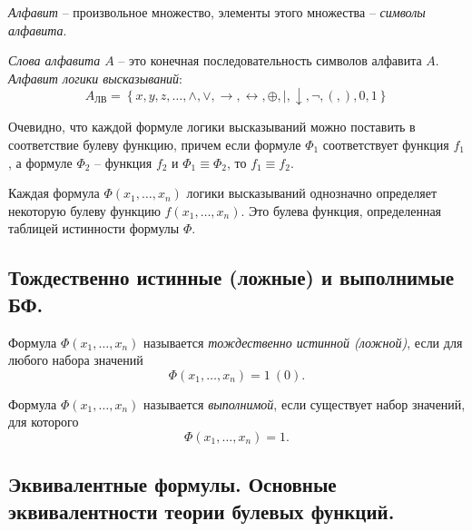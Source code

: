 \begin{remark}
    \emph{Алфавит} -- произвольное множество, элементы этого множества -- \emph{символы алфавита}.

    \emph{Слова алфавита $A$} -- это конечная последовательность символов алфавита $A$. \emph{Алфавит логики высказываний}:
    \[
        A_{\text{ЛВ}} = \left\{x,y,z,\ldots,\land,\lor,\rightarrow,\leftrightarrow,\oplus,\vert,\downarrow,\lnot,(,),0,1\right\}
    \]
\end{remark}

\begin{remark}
    Очевидно, что каждой формуле логики высказываний можно поставить в соответствие булеву функцию, причем если формуле $\Phi_1$ соответствует функция $f_1$, а формуле $\Phi_2$ -- функция $f_2$ и $\Phi_1 \equiv \Phi_2$, то $f_1 \equiv f_2$.

    Каждая формула $\Phi(x_1,\ldots,x_n)$ логики высказываний однозначно определяет некоторую булеву функцию $f(x_1,\ldots,x_n)$. Это булева функция, определенная таблицей истинности формулы $\Phi$.
\end{remark}

\subsection{Тождественно истинные (ложные) и выполнимые БФ.}

\begin{definition}
    Формула $\Phi(x_1,\ldots,x_n)$ называется \emph{тождественно истинной (ложной)}, если для любого набора значений
    \[
        \Phi(x_1,\ldots,x_n) = 1 \ (0).
    \]
\end{definition}

\begin{definition}
    Формула $\Phi(x_1,\ldots,x_n)$ называется \emph{выполнимой}, если существует набор значений, для которого
    \[
        \Phi(x_1,\ldots,x_n) = 1.
    \]
\end{definition}

\subsection{Эквивалентные формулы. Основные эквивалентности теории булевых функций.}

